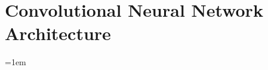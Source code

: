 \documentclass[
11pt, %
oneside, %
english, %
singlespacing, %
liststotoc, %
toctotoc, %
parskip, %
headsepline, %
]{MastersDoctoralThesis} %
\newcommand{\appendixinput}[1]{}
\begin{document}
\chapter{Convolutional Neural Network Architecture}
\appendixinput{cnnArchitectures.tex}


\emergencystretch=1em


\printbibliography[heading=bibintoc]

\end{document}
